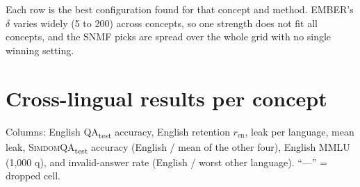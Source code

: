 \documentclass[11pt]{article}
\newcommand{\qatest}{\textsc{QA}\textsubscript{test}}
\newcommand{\simdomtest}{\textsc{SimdomQA}\textsubscript{test}}
\begin{document}
Each row is the best configuration found for that concept and method. EMBER's $\delta$ varies widely (5 to 200) across concepts, so one strength does not fit all concepts, and the SNMF picks are spread over the whole grid with no single winning setting.

\section{Cross-lingual results per concept}\label{app:C}
\setcounter{table}{0}

Columns: English \qatest{} accuracy, English retention $r_{\mathrm{en}}$, leak per language, mean leak, \simdomtest{} accuracy (English / mean of the other four), English MMLU (1,000 q), and invalid-answer rate (English / worst other language). ``---'' = dropped cell.
\end{document}
